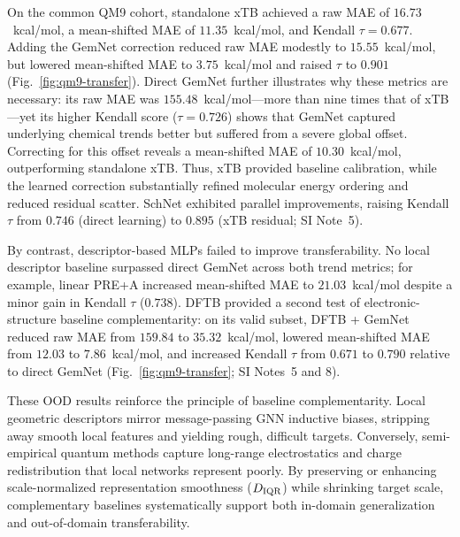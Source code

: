 On the common QM9 cohort, standalone xTB achieved a raw MAE of $16.73$~kcal/mol, a mean-shifted MAE of $11.35$~kcal/mol, and Kendall $\tau = 0.677$. Adding the GemNet correction reduced raw MAE modestly to $15.55$~kcal/mol, but lowered mean-shifted MAE to $3.75$~kcal/mol and raised $\tau$ to $0.901$ (Fig.~\ref{fig:qm9-transfer}). Direct GemNet further illustrates why these metrics are necessary: its raw MAE was $155.48$~kcal/mol—more than nine times that of xTB—yet its higher Kendall score ($\tau = 0.726$) shows that GemNet captured underlying chemical trends better but suffered from a severe global offset. Correcting for this offset reveals a mean-shifted MAE of $10.30$~kcal/mol, outperforming standalone xTB. Thus, xTB provided baseline calibration, while the learned correction substantially refined molecular energy ordering and reduced residual scatter. SchNet exhibited parallel improvements, raising Kendall $\tau$ from $0.746$ (direct learning) to $0.895$ (xTB residual; SI Note~5).

By contrast, descriptor-based MLPs failed to improve transferability. No local descriptor baseline surpassed direct GemNet across both trend metrics; for example, linear PRE+A increased mean-shifted MAE to $21.03$~kcal/mol despite a minor gain in Kendall $\tau$ ($0.738$). DFTB provided a second test of electronic-structure baseline complementarity: on its valid subset, DFTB + GemNet reduced raw MAE from $159.84$ to $35.32$~kcal/mol, lowered mean-shifted MAE from $12.03$ to $7.86$~kcal/mol, and increased Kendall $\tau$ from $0.671$ to $0.790$ relative to direct GemNet (Fig.~\ref{fig:qm9-transfer}; SI Notes~5 and 8).

These OOD results reinforce the principle of baseline complementarity. Local geometric descriptors mirror message-passing GNN inductive biases, stripping away smooth local features and yielding rough, difficult targets. Conversely, semi-empirical quantum methods capture long-range electrostatics and charge redistribution that local networks represent poorly. By preserving or enhancing scale-normalized representation smoothness ($D_{\rm IQR}$) while shrinking target scale, complementary baselines systematically support both in-domain generalization and out-of-domain transferability.
